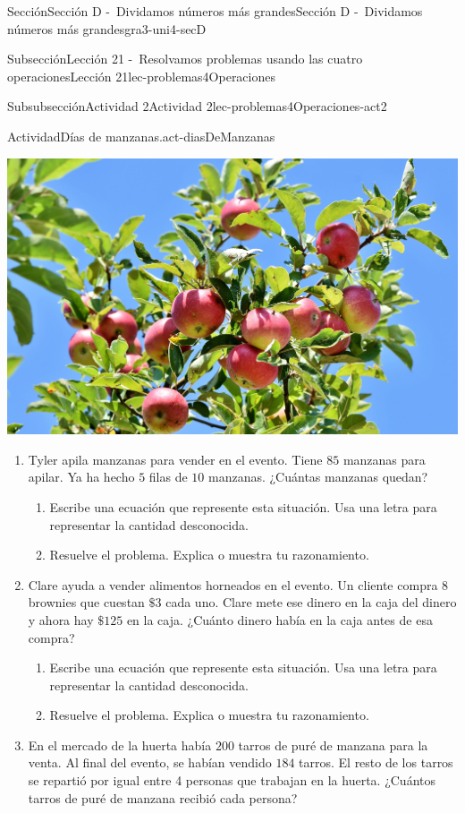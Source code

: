 \documentclass[twoside,10pt,]{article}
\begin{document}
\begin{sectionptx}{Sección}{Sección D -~Dividamos números más grandes}{}{Sección D -~Dividamos números más grandes}{}{}{gra3-uni4-secD}
\begin{subsectionptx}{Subsección}{Lección 21 -~Resolvamos problemas usando las cuatro operaciones}{}{Lección 21}{}{}{lec-problemas4Operaciones}
\begin{subsubsectionptx}{Subsubsección}{Actividad 2}{}{Actividad 2}{}{}{lec-problemas4Operaciones-act2}
\begin{activity}{Actividad}{Días de manzanas.}{act-diasDeManzanas}
\begin{sidebyside}{2}{0}{0.05}{0.05}
\begin{sbspanel}{0.3}
\includegraphics[width=\linewidth]{external/jpg-source/apple-3535566_1920.jpg}
\end{sbspanel}%
\end{sidebyside}%
%
\begin{enumerate}
\item{}Tyler apila manzanas para vender en el evento. Tiene \(85\) manzanas para apilar. Ya ha hecho \(5\) filas de \(10\) manzanas. ¿Cuántas manzanas quedan?%
%
\begin{enumerate}
\item{}Escribe una ecuación que represente esta situación. Usa una letra para representar la cantidad desconocida.%
\item{}Resuelve el problema. Explica o muestra tu razonamiento.%
\end{enumerate}
\item{}Clare ayuda a vender alimentos horneados en el evento. Un cliente compra \(8\) brownies que cuestan \(\$3\) cada uno. Clare mete ese dinero en la caja del dinero y ahora hay \(\$125\) en la caja. ¿Cuánto dinero había en la caja antes de esa compra?%
%
\begin{enumerate}
\item{}Escribe una ecuación que represente esta situación. Usa una letra para representar la cantidad desconocida.%
\item{}Resuelve el problema. Explica o muestra tu razonamiento.%
\end{enumerate}
\item{}En el mercado de la huerta había \(200\) tarros de puré de manzana para la venta. Al final del evento, se habían vendido \(184\) tarros. El resto de los tarros se repartió por igual entre 4 personas que trabajan en la huerta. ¿Cuántos tarros de puré de manzana recibió cada persona?%

\end{enumerate}
\end{activity}
\end{subsubsectionptx}
\end{subsectionptx}
\end{sectionptx}
\end{document}
